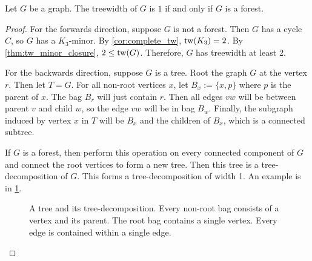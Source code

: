 \begin{proposition}\label{lem:treewidth_forest}
	Let $G$ be a graph. The treewidth of $G$ is $1$ if and only if \(G\) is a forest.
\end{proposition}

\begin{proof}
	For the forwards direction, suppose $G$ is not a forest. Then \(G\) has a cycle \(C\), so $G$ has a $K_3$-minor. By \cref{cor:complete_tw}, $\operatorname{tw}(K_3) = 2$. By \cref{thm:tw_minor_closure}, $2 \leq \operatorname{tw}(G)$. Therefore, $G$ has treewidth at least 2. 

	For the backwards direction, suppose \(G\) is a tree. Root the graph \(G\) at the vertex \(r\). Then let \(T = G\). For all non-root vertices $x$, let \(B_x:= \lbrace x, p \rbrace\) where \(p\) is the parent of \(x\). The bag \(B_r\) will just contain \(r\). Then all edges \(vw\) will be between parent \(v\) and child \(w\), so the edge $vw$ will be in bag \(B_w\). Finally, the subgraph induced by vertex \(x\) in \(T\) will be \(B_x\) and the children of \(B_x\), which is a connected subtree.

	If \(G\) is a forest, then perform this operation on every connected component of \(G\) and connect the root vertices to form a new tree. Then this tree is a tree-decomposition of $G$. This forms a tree-decomposition of width 1. An example is in \cref{fig:tree-treedecomp}.
	\begin{figure}[ht]
		\centering
		
		
		\caption[Tree-Decomposition of a tree]{A tree and its tree-decomposition. Every non-root bag consists of a vertex and its parent. The root bag contains a single vertex. Every edge is contained within a single edge.}\label{fig:tree-treedecomp}
	\end{figure}
\end{proof}


